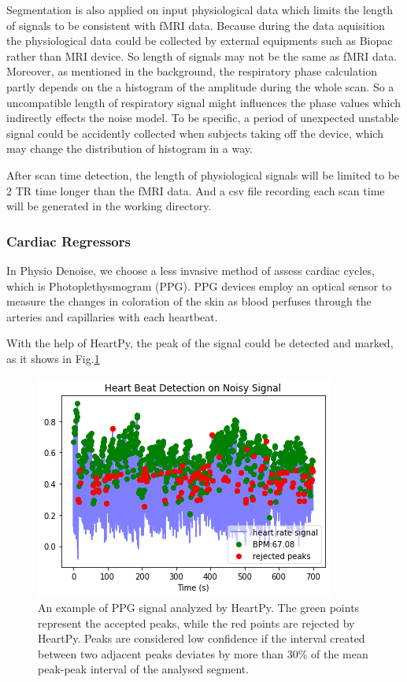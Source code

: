 Segmentation is also applied on input physiological data which
limits the length of signals to be consistent with fMRI data. Because during the data aquisition the physiological
data could be collected by external equipments such as Biopac rather than MRI device.
So length of signals may not be the same as fMRI data. Moreover, as mentioned in the background, the respiratory phase calculation 
partly depends on the a histogram of the amplitude during the whole scan. So a uncompatible length of 
respiratory signal might influences the phase values which indirectly effects the noise model. To be specific, 
a period of unexpected unstable signal could be accidently collected when subjects taking off the 
device, which may change the distribution of histogram in a way.

After scan time detection, the length of physiological signals will be limited to be 2 TR time longer than the 
fMRI data. And a csv file recording each scan time will be generated in the working directory.

\subsubsection{Cardiac Regressors}

In Physio Denoise, we choose a less invasive method of assess cardiac cycles, which is Photoplethysmogram (PPG). 
PPG devices employ an optical sensor to measure the changes in coloration of the skin as blood perfuses through the arteries and capillaries with each heartbeat.\cite{van2019heartpy}

With the help of HeartPy, the peak of the signal could be detected and marked, as it shows in Fig.\ref{fig:heart}

\begin{figure}[htp]
    \centering
    \includegraphics[width=\columnwidth]{Figures/heartpy.png}
    \caption{An example of PPG signal analyzed by HeartPy. The green points represent the accepted peaks,
    while the red points are rejected by HeartPy. Peaks are considered low confidence if the interval created between two adjacent peaks deviates 
    by more than 30\% of the mean peak-peak interval of the analysed segment.\cite{van2019heartpy}}
    \label{fig:heart}
\end{figure} 

